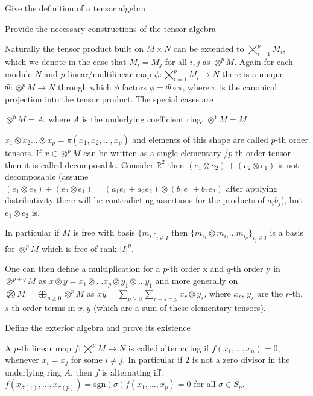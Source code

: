 Give the definition of a tensor algebra

Provide the necessary constructions of the tensor algebra

Naturally the tensor product built on \(M \times N\) can be extended to \(\bigtimes_{i = 1}^{p} M_i\),
which we denote in the case that \(M_i = M_j\) for all \(i, j\) as \(\otimes^{p} M\).
Again for each module \(N\) and \(p\)-linear/multilinear map \(\phi : \bigtimes_{i = 1}^{p} M_i \to N \) there is a unique \(\Phi : \otimes^{p} M \to N\)
through which \(\phi\) factors \(\phi = \Phi \circ \pi\), where \(\pi\) is the canonical projection into the tensor product.
The special cases are 

\(\otimes^{0} M = A\), where \(A\) is the underlying coefficient ring.
\(\otimes^{1} M = M\)

\(x_1 \otimes x_2 \dots \otimes x_p = \pi(x_1, x_2, \dots, x_p) \) and elements of this shape
are called \(p\)-th order tensors. If \(x \in \otimes^{p} M\) can be written as a single elementary
/\(p\)-th order tensor then it is called decomposable. Consider \(\mathbb{R}^{2}\) then \((e_1 \otimes e_2) + (e_2 \otimes e_1)\)
is not decomposable (assume \((e_1 \otimes e_2) + (e_2 \otimes e_1) = (a_1 e_1 + a_2 e_2) \otimes (b_1 e_1 + b_2 e_2)\) after applying
distributivity there will be contradicting assertions for the products of \(a_ib_j\)), but \(e_1 \otimes e_2\) is.

In particular if \(M\) is free with basis \(\{m_i\}_{i \in I}\) then \(\{m_{i_1} \otimes m_{i_2} \dots m_{i_p}\}_{i_j \in I}\)
is a basis for \(\otimes^{p} M\) which is free of rank \(|I|^p\).

One can then define a multiplication for a \(p\)-th order x and \(q\)-th order y in \(\otimes^{p + q} M\) as \(x \otimes y = x_1 \otimes \dots x_p \otimes y_1 \otimes \dots y_1\) and more generally on \(\bigotimes M = \bigoplus_{p \geq 0} \otimes^{p} M\) as \(x y = \sum_{p \geq 0} \sum_{r + s = p} x_r \otimes y_s\), where \(x_r\), \(y_s\) are the \(r\)-th, \(s\)-th order terms in \(x, y\) (which are a sum of these elementary tensors).


Define the exterior algebra and prove its existence

A \(p\)-th linear map \(f : \bigtimes^{p} M \to N\) is called alternating if \(f(x_1, \dots, x_n) = 0\), whenever \(x_i = x_j\) for some \(i \neq j\).
In particular if \(2\) is not a zero divisor in the underlying ring \(A\), then \(f\) is alternating iff. 
\(f(x_{\sigma(1)}, \dots, x_{\sigma(p)}) = \text{sgn}(\sigma)f(x_1, \dots, x_p) = 0\) for all \(\sigma \in S_p\).

